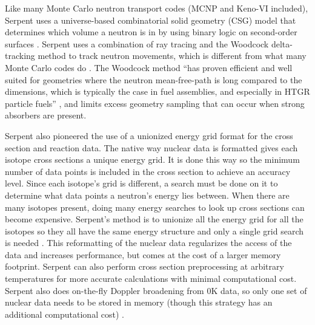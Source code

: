 Like many Monte Carlo neutron transport codes (MCNP and Keno-VI included), Serpent uses a universe-based combinatorial solid geometry (CSG) model that determines which volume a neutron is in by using binary logic on second-order surfaces \cite{mcnp, serpent}.  Serpent uses a combination of ray tracing and the Woodcock delta-tracking method to track neutron movements, which is different from what many Monte Carlo codes do \cite{serpent}.  
The Woodcock method ``has proven efficient and well suited for geometries where the neutron mean-free-path is long compared to the dimensions, which is typically the case in fuel assemblies, and especially in HTGR particle fuels'' \cite{serpent}, and limits excess geometry sampling that can occur when strong absorbers are present.

Serpent also pioneered the use of a unionized energy grid format for the cross section and reaction data.  The native way nuclear data is formatted gives each isotope cross sections a unique energy grid.  It is done this way so the minimum number of data points is included in the cross section to achieve an accuracy level.  Since each isotope's grid is different, a search must be done on it to determine what data points a neutron's energy lies between.  When there are many isotopes present, doing many energy searches to look up cross sections can become expensive.  Serpent's method is to unionize all the energy grid for all the isotopes so they all have the same energy structure and only a single grid search is needed \cite{jaakko}.  
  This reformatting of the nuclear data regularizes the access of the data and increases performance, but comes at the cost of a larger memory footprint.  Serpent can also perform cross section preprocessing at arbitrary temperatures for more accurate calculations with minimal computational cost. Serpent also does on-the-fly Doppler broadening from 0K data, so only one set of nuclear data needs to be stored in memory (though this strategy has an additional computational cost) \cite{serpent}.


